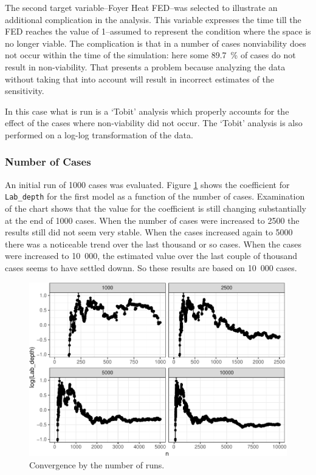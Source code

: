 \documentclass[12pt,twoside]{book}
\begin{document}
The second target variable--Foyer Heat FED--was selected to illustrate an additional complication in the analysis. This variable expresses the time till the FED reaches the value of 1--assumed to represent the condition where the space is no longer viable. The complication is that in a number of cases nonviability does not occur within the time of the simulation: here some 89.7~\% of cases do not result in non-viability. That presents a problem because analyzing the data without taking that into account will result in incorrect estimates of the sensitivity.

In this case what is run is a `Tobit' analysis\cite{Tobin:1958} which properly accounts for the effect of the cases where non-viability did not occur. The `Tobit' analysis is also performed on a log-log transformation of the data.

\hypertarget{number-of-cases}{%
\subsubsection{Number of Cases}\label{number-of-cases}}

An initial run of 1000 cases was evaluated. Figure \ref{Ex_2-convergence_of_mean} shows the coefficient for \texttt{Lab\_depth} for the first model as a function of the number of cases. Examination of the chart shows that the value for the coefficient is still changing substantially at the end of 1000 cases. When the number of cases were increased to 2500 the results still did not seem very stable. When the cases increased again to 5000 there was a noticeable trend over the last thousand or so cases. When the cases were increased to 10~000, the estimated value over the last couple of thousand cases seems to have settled downn. So these results are based on 10~000 cases.

\begin{figure}[h!]
\centering
\includegraphics[width=4.5in]{FIGURES/ex2_cvg_plot-1.pdf}
\caption{Convergence by the number of runs.}
\label{Ex_2-convergence_of_mean}
\end{figure}
\end{document}
